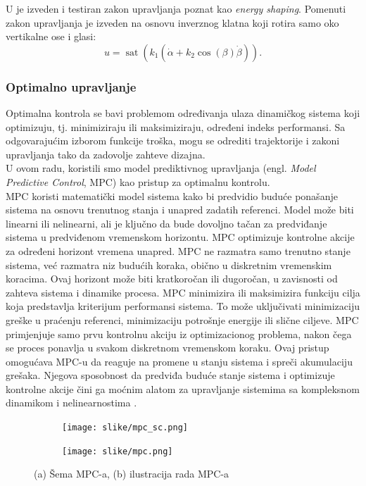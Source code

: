\documentclass[a4paper,11pt]{article}
\theoremstyle{definition} \newtheorem{deff}{Definicija}[section]
\theoremstyle{definition} \newtheorem{prim}[deff]{Primer}
\theoremstyle{plain} \newtheorem{teor}[deff]{Teorema}
\begin{document}
	U \cite{ener_shaping} je izveden i testiran zakon upravljanja poznat kao \textit{energy shaping}. Pomenuti zakon upravljanja je izveden na osnovu inverznog klatna koji rotira samo oko vertikalne ose i glasi: \\
	
	\begin{equation}
		u = \operatorname{sat}(k_1 (\dot\alpha + k_2 \cos(\beta) \dot\beta)).
	\end{equation}
	
	\subsubsection{Optimalno upravljanje}
	Optimalna kontrola se bavi problemom određivanja ulaza dinamičkog sistema koji optimizuju, tj. minimiziraju ili maksimiziraju, određeni indeks performansi. Sa odgovarajućim izborom funkcije troška, mogu se odrediti trajektorije i zakoni upravljanja tako da zadovolje zahteve dizajna.\\
	
	U ovom radu, koristili smo model prediktivnog upravljanja (engl. \emph{Model Predictive Control}, MPC) kao pristup za optimalnu kontrolu. \\
	
	MPC koristi matematički model sistema kako bi predvidio buduće ponašanje sistema na osnovu trenutnog stanja i unapred zadatih referenci. Model može biti linearni ili nelinearni, ali je ključno da bude dovoljno tačan za predviđanje sistema u predviđenom vremenskom horizontu. MPC optimizuje kontrolne akcije za određeni horizont vremena unapred. MPC ne razmatra samo trenutno stanje sistema, već razmatra niz budućih koraka, obično u diskretnim vremenskim koracima. Ovaj horizont može biti kratkoročan ili dugoročan, u zavisnosti od zahteva sistema i dinamike procesa. MPC minimizira ili maksimizira funkciju cilja koja predstavlja kriterijum performansi sistema. To može uključivati minimizaciju greške u praćenju referenci, minimizaciju potrošnje energije ili slične ciljeve. MPC primjenjuje samo prvu kontrolnu akciju iz optimizacionog problema, nakon čega se proces ponavlja u svakom diskretnom vremenskom koraku. Ovaj pristup omogućava MPC-u da reaguje na promene u stanju sistema i spreči akumulaciju grešaka. Njegova sposobnost da predviđa buduće stanje sistema i optimizuje kontrolne akcije čini ga moćnim alatom za upravljanje sistemima sa kompleksnom dinamikom i nelinearnostima \cite{mpc}.\\
	
	
	\begin{figure}[!htb]
		\centering
		\begin{subfigure}{0.5\linewidth}
			\centering
			\texttt{[image: slike/mpc\_sc.png]}
			\caption{}
			\label{fig:mpc_sc}
		\end{subfigure}
		\hfill
		\begin{subfigure}{0.48\linewidth}
			\centering
			\texttt{[image: slike/mpc.png]}
			\caption{}
			\label{fig:mpc_f}
		\end{subfigure}
		\caption{(a) Šema MPC-a, (b) ilustracija rada MPC-a \cite{mpc} }
	\end{figure}
	
\end{document}
